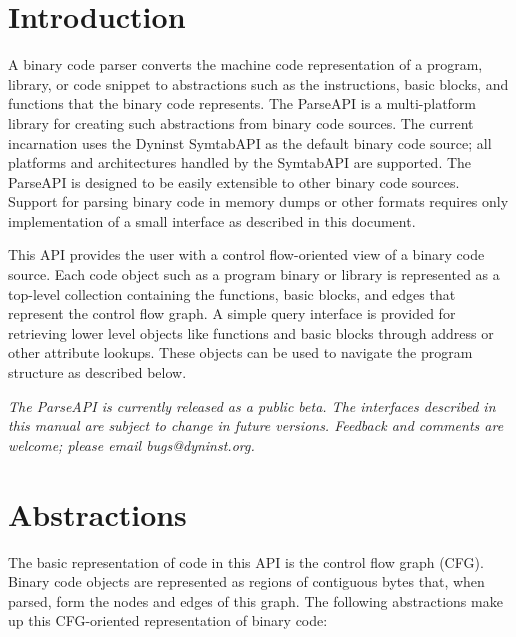 \documentclass{article}
\begin{document}
\tableofcontents
\clearpage

\section{Introduction}
\label{sec:intro}

A binary code parser converts the machine code representation of a program,
library, or code snippet to abstractions such as the instructions, basic
blocks, and functions that the binary code represents. The ParseAPI is a
multi-platform library for creating such abstractions from binary code sources.
The current incarnation uses the Dyninst SymtabAPI as the default binary code
source; all platforms and architectures handled by the SymtabAPI are supported.
The ParseAPI is designed to be easily extensible to other binary code sources.
Support for parsing binary code in memory dumps or other formats requires only
implementation of a small interface as described in this document.

This API provides the user with a control flow-oriented view of a binary code
source. Each code object such as a program binary or library is represented as
a top-level collection containing the functions, basic blocks, and edges that
represent the control flow graph. A simple query interface is provided for
retrieving lower level objects like functions and basic blocks through address
or other attribute lookups. These objects can be used to navigate the program
structure as described below.

\emph{The ParseAPI is currently released as a public beta. The interfaces
described in this manual are subject to change in future versions. Feedback and
comments are welcome; please email bugs@dyninst.org.}

\section{Abstractions}
\label{sec:abstractions}

The basic representation of code in this API is the control flow
graph (CFG). Binary code objects are represented as regions of contiguous bytes that, when parsed, form the nodes and edges of this graph. The following abstractions make up this CFG-oriented representation of binary code:
\end{document}
